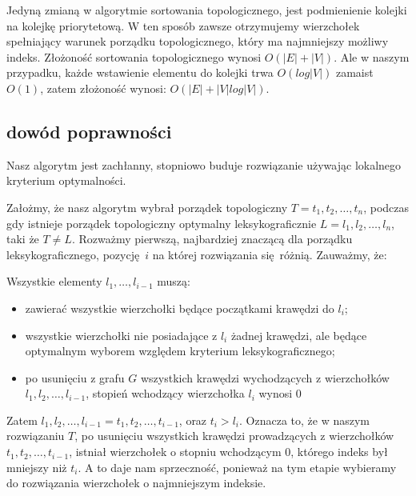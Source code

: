 \documentclass[svgnames]{report}
\begin{document}
Jedyną zmianą w algorytmie sortowania topologicznego, jest podmienienie kolejki na kolejkę priorytetową. W ten sposób zawsze otrzymujemy wierzchołek spełniający warunek porządku topologicznego, który ma najmniejszy możliwy indeks.
Złożoność sortowania topologicznego wynosi $O(|E| + |V|)$. Ale w naszym przypadku, każde wstawienie elementu do kolejki trwa $O(log |V|)$ zamaist $O(1)$, zatem złożoność wynosi: $O(|E| + |V| log |V|)$.

\subsection{dowód poprawności}
Nasz algorytm jest zachłanny, stopniowo buduje rozwiązanie używając lokalnego kryterium optymalności.

Założmy, że nasz algorytm wybrał porządek topologiczny $T = t_1,t_2, \dots, t_n$, podczas gdy istnieje porządek topologiczny optymalny leksykograficznie $L = l_1, l_2, \dots, l_n$, taki że $T \not = L$. Rozważmy pierwszą, najbardziej znaczącą dla porządku leksykograficznego, pozycję $i$ na której rozwiązania się różnią. Zauważmy, że:

Wszystkie elementy $l_1, \dots, l_{i-1}$ muszą:
\begin{itemize}
\item zawierać wszystkie wierzchołki będące początkami krawędzi do $l_i$;
\item wszystkie wierzchołki nie posiadające z $l_i$ żadnej krawędzi, ale będące optymalnym wyborem względem kryterium leksykograficznego;
\item po usunięciu z grafu $G$ wszystkich krawędzi wychodzących z wierzchołków $l_1,l_2, \dots, l_{i-1}$, stopień wchodzący wierzchołka $l_i$ wynosi $0$
\end{itemize}

Zatem $l_1,l_2, \dots, l_{i-1} = t_1, t_2, \dots, t_{i-1}$, oraz $t_i > l_i$. 
Oznacza to, że w naszym rozwiązaniu $T$, po usunięciu wszystkich krawędzi prowadzących z wierzchołków $t_1,t_2, \dots, t_{i-1}$, istniał wierzchołek o stopniu wchodzącym $0$, którego indeks był mniejszy niż $t_i$. A to daje nam sprzeczność, ponieważ na tym etapie wybieramy do rozwiązania wierzchołek o najmniejszym indeksie.

\section{}%
\\
\end{document}
